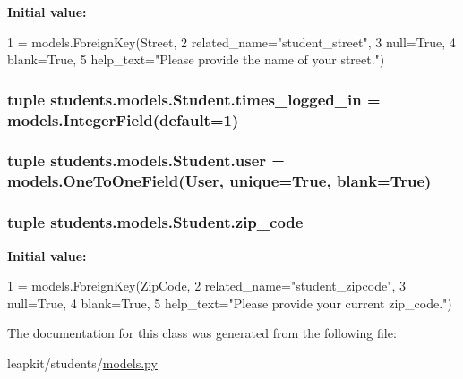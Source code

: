 {\bfseries Initial value\-:}
\begin{DoxyCode}
1 = models.ForeignKey(Street,
2                                related\_name=\textcolor{stringliteral}{"student\_street"},
3                                null=\textcolor{keyword}{True},
4                                blank=\textcolor{keyword}{True},
5                                help\_text=\textcolor{stringliteral}{"Please provide the name of your street."})
\end{DoxyCode}
\hypertarget{classstudents_1_1models_1_1_student_a9254eb630a5d3de52a566b11c8ab6f1b}{
\subsubsection[{times\-\_\-logged\-\_\-in}]{\setlength{\rightskip}{0pt plus 5cm}tuple students.\-models.\-Student.\-times\-\_\-logged\-\_\-in = models.\-Integer\-Field(default=1)\hspace{0.3cm}{\ttfamily [static]}}}\label{classstudents_1_1models_1_1_student_a9254eb630a5d3de52a566b11c8ab6f1b}
\hypertarget{classstudents_1_1models_1_1_student_a7c56f44c930c1bcdd80f8f8860af5bee}{
\subsubsection[{user}]{\setlength{\rightskip}{0pt plus 5cm}tuple students.\-models.\-Student.\-user = models.\-One\-To\-One\-Field(User, unique=True, blank=True)\hspace{0.3cm}{\ttfamily [static]}}}\label{classstudents_1_1models_1_1_student_a7c56f44c930c1bcdd80f8f8860af5bee}
\hypertarget{classstudents_1_1models_1_1_student_a276c47ab433d4e1f7e4aff01036bd9cf}{
\subsubsection[{zip\-\_\-code}]{\setlength{\rightskip}{0pt plus 5cm}tuple students.\-models.\-Student.\-zip\-\_\-code\hspace{0.3cm}{\ttfamily [static]}}}\label{classstudents_1_1models_1_1_student_a276c47ab433d4e1f7e4aff01036bd9cf}
{\bfseries Initial value\-:}
\begin{DoxyCode}
1 = models.ForeignKey(ZipCode,
2                                  related\_name=\textcolor{stringliteral}{"student\_zipcode"},
3                                  null=\textcolor{keyword}{True},
4                                  blank=\textcolor{keyword}{True},
5                                  help\_text=\textcolor{stringliteral}{"Please provide your current zip\_code."})
\end{DoxyCode}


The documentation for this class was generated from the following file\-:\begin{DoxyCompactItemize}
\item 
leapkit/students/\hyperlink{models_8py}{models.\-py}\end{DoxyCompactItemize}
